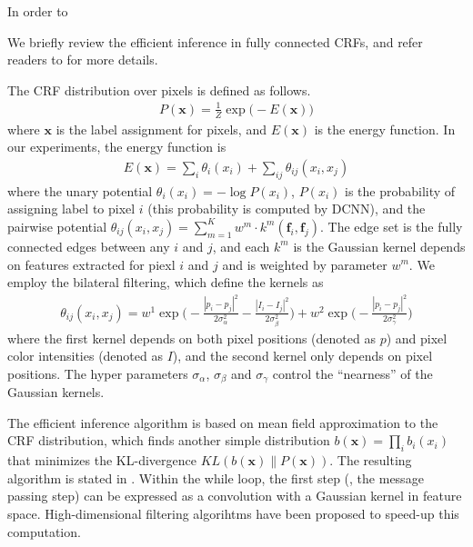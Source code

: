 In order to 

We briefly review the efficient inference in fully connected CRFs, and refer readers to \citep{krahenbuhl2011efficient} for more details. 

The CRF distribution over pixels is defined as follows.
\begin{align}
  P(\boldsymbol{x}) = \frac{1}{Z} \exp \Big(-E(\boldsymbol{x})\Big)
\end{align}
where $\boldsymbol{x}$ is the label assignment for pixels, and $E(\boldsymbol{x})$ is the energy function. In our experiments, the energy function is
\begin{align}
  E(\boldsymbol{x}) = \sum_i \theta_i(x_i) + \sum_{ij} \theta_{ij}(x_i, x_j)
\end{align}
where the unary potential $\theta_i(x_i) = - \log P(x_i)$, $P(x_i)$ is the probability of assigning label to pixel $i$ (this probability is computed by DCNN), and the pairwise potential $\theta_{ij}(x_i, x_j) = \sum_{m=1}^{K} w^m \cdot k^m(\boldsymbol{f}_i, \boldsymbol{f}_j)$. The edge set is the fully connected edges between any $i$ and $j$, and each $k^m$ is the Gaussian kernel depends on features extracted for piexl $i$ and $j$ and is weighted by parameter $w^m$. We employ the bilateral filtering, which define the kernels as 
\begin{align}
  \theta_{ij}(x_i, x_j) = w^1 \exp \Big(-\frac{|p_i-p_j|^2}{2\sigma_\alpha^2} -\frac{|I_i-I_j|^2}{2\sigma_\beta^2} \Big) + w^2 \exp \Big(-\frac{|p_i-p_j|^2}{2\sigma_\gamma^2}\Big)
\end{align}
where the first kernel depends on both pixel positions (denoted as $p$) and pixel color intensities (denoted as $I$), and the second kernel only depends on pixel positions. The hyper parameters $\sigma_\alpha$, $\sigma_\beta$ and $\sigma_\gamma$ control the ``nearness'' of the Gaussian kernels.

The efficient inference algorithm is based on mean field approximation to the CRF distribution, which finds another simple distribution $b(\boldsymbol{x}) = \prod_i b_i(x_i)$ that minimizes the KL-divergence $KL(b(\boldsymbol{x}) \| P(\boldsymbol{x}))$. The resulting algorithm is stated in . Within the while loop, the first step (\ie, the message passing step) can be expressed as a convolution with a Gaussian kernel in feature space. High-dimensional filtering algorihtms \citep{adams2010fast} have been proposed to speed-up this computation.

